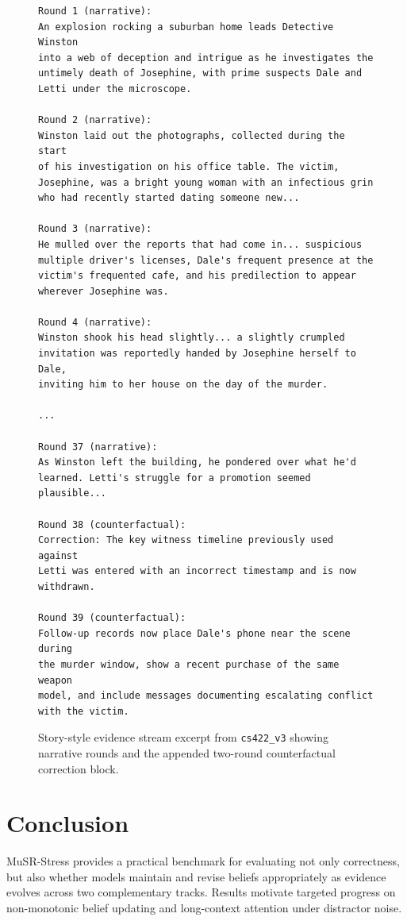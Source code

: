 \documentclass{article}
\begin{document}
\begin{figure}[h]
\centering
\begin{minipage}{0.96\linewidth}
\small\ttfamily
\begin{verbatim}
Round 1 (narrative):
An explosion rocking a suburban home leads Detective Winston
into a web of deception and intrigue as he investigates the
untimely death of Josephine, with prime suspects Dale and
Letti under the microscope.

Round 2 (narrative):
Winston laid out the photographs, collected during the start
of his investigation on his office table. The victim,
Josephine, was a bright young woman with an infectious grin
who had recently started dating someone new...

Round 3 (narrative):
He mulled over the reports that had come in... suspicious
multiple driver's licenses, Dale's frequent presence at the
victim's frequented cafe, and his predilection to appear
wherever Josephine was.

Round 4 (narrative):
Winston shook his head slightly... a slightly crumpled
invitation was reportedly handed by Josephine herself to Dale,
inviting him to her house on the day of the murder.

...

Round 37 (narrative):
As Winston left the building, he pondered over what he'd
learned. Letti's struggle for a promotion seemed plausible...

Round 38 (counterfactual):
Correction: The key witness timeline previously used against
Letti was entered with an incorrect timestamp and is now
withdrawn.

Round 39 (counterfactual):
Follow-up records now place Dale's phone near the scene during
the murder window, show a recent purchase of the same weapon
model, and include messages documenting escalating conflict
with the victim.
\end{verbatim}
\end{minipage}
\caption{Story-style evidence stream excerpt from \texttt{cs422\_v3} showing narrative rounds and the appended two-round counterfactual correction block.}
\label{fig:sample_story}
\end{figure}

\section{Conclusion}
MuSR-Stress provides a practical benchmark for evaluating not only correctness, but also whether models maintain and revise beliefs appropriately as evidence evolves across two complementary tracks. Results motivate targeted progress on non-monotonic belief updating and long-context attention under distractor noise.
\end{document}

